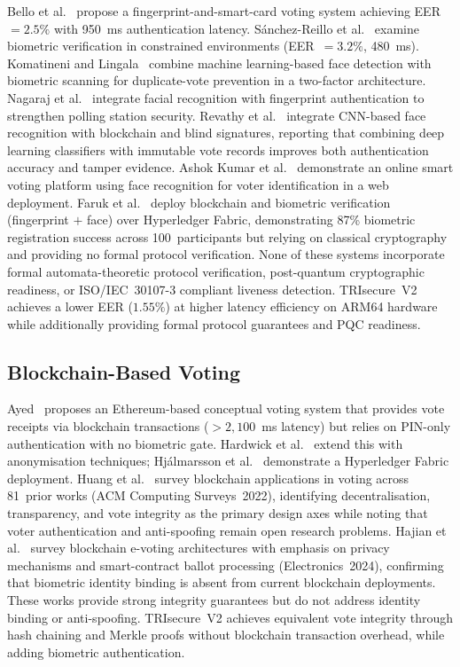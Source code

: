 \documentclass[preprint,12pt]{elsarticle}
\begin{document}
Bello et al.~\cite{bello2021biometric} propose a fingerprint-and-smart-card
voting system achieving EER~$=2.5\%$ with 950~ms authentication latency.
Sánchez-Reillo et al.~\cite{sanchez2020biometric} examine biometric
verification in constrained environments (EER~$=3.2\%$, 480~ms).
Komatineni and Lingala~\cite{komatineni2020biometric} combine machine
learning-based face detection with biometric scanning for duplicate-vote
prevention in a two-factor architecture.
Nagaraj et al.~\cite{nagaraj2022voting} integrate facial recognition with
fingerprint authentication to strengthen polling station security.
Revathy et al.~\cite{revathy2022cnn_evoting} integrate CNN-based face
recognition with blockchain and blind signatures, reporting that combining
deep learning classifiers with immutable vote records improves both
authentication accuracy and tamper evidence.
Ashok Kumar et al.~\cite{ashokkumar2023smart} demonstrate an online smart
voting platform using face recognition for voter identification in a web
deployment.
Faruk et al.~\cite{faruk2024transforming} deploy blockchain and biometric
verification (fingerprint $+$ face) over Hyperledger Fabric, demonstrating
87\% biometric registration success across 100~participants but relying on
classical cryptography and providing no formal protocol verification.
None of these systems incorporate formal automata-theoretic protocol
verification, post-quantum cryptographic readiness, or ISO/IEC~30107-3
compliant liveness detection.
TRIsecure~V2 achieves a lower EER ($1.55\%$) at higher latency efficiency
on ARM64 hardware while additionally providing formal protocol guarantees
and PQC readiness.

\subsection{Blockchain-Based Voting}

Ayed~\cite{ayed2017conceptual} proposes an Ethereum-based conceptual
voting system that provides vote receipts via blockchain transactions
($>2{,}100$~ms latency) but relies on PIN-only authentication with no
biometric gate. Hardwick et al.~\cite{hardwick2018voting} extend this with
anonymisation techniques; Hjálmarsson et al.~\cite{hjalmarsson2018blockchain}
demonstrate a Hyperledger Fabric deployment.
Huang et al.~\cite{huang2022blockchain_voting} survey blockchain
applications in voting across 81~prior works (ACM Computing Surveys~2022),
identifying decentralisation, transparency, and vote integrity as the
primary design axes while noting that voter authentication and
anti-spoofing remain open research problems.
Hajian et al.~\cite{hajian2024blockchain} survey blockchain e-voting
architectures with emphasis on privacy mechanisms and smart-contract ballot
processing (Electronics~2024), confirming that biometric identity binding
is absent from current blockchain deployments.
These works provide strong integrity guarantees but do not address identity
binding or anti-spoofing.
TRIsecure~V2 achieves equivalent vote integrity through hash chaining and
Merkle proofs without blockchain transaction overhead, while adding
biometric authentication.
\end{document}
